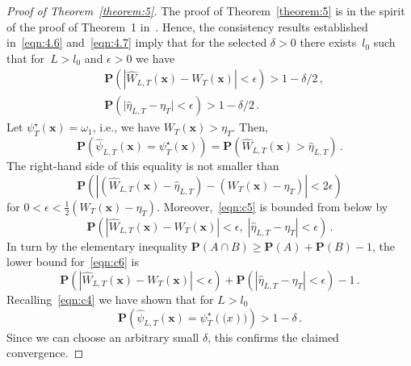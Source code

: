 \documentclass[lettersize,journal,onecolumn]{IEEEtran}
\theoremstyle{definition}
\begin{document}
\begin{proof}[Proof of Theorem~\ref{theorem:5}]
	The proof of Theorem~\ref{theorem:5} is in the spirit of the proof of Theorem~1
	in~\cite{greblicki1978asymptotically}. Hence, the consistency results established
	in~\eqref{eqn:4.6} and~\eqref{eqn:4.7} imply that for the selected $\delta>0$ there
	exists~$l_{0}$ such that for~$L > l_{0}$ and $\epsilon >0 $ we have
	\begin{equation}
		\begin{split}
			& \mathbf{P}\left(
			\left|
			\widehat{W}_{L,T}(\mathbf{x}) - W_{T}(\mathbf{x})
			\right| < \epsilon
			\right) > 1 - \delta/2
			\,,\\
			& \mathbf{P}\left(
			\Big|
			\widehat{\eta}_{L,T} - \eta_{T}
			\Big| < \epsilon
			\right) > 1 - \delta/2
			\,.
		\end{split}
		\label{eqn:c4}
	\end{equation}
	Let \mbox{$\psi_{T}^{\star}(\mathbf{x})=\omega_{1}$}, i.e., we have
	\mbox{$W_{T}(\mathbf{x})>\eta_{T}$}. Then,
	\begin{equation*}
		\mathbf{P}\left(
		\widehat{\psi}_{L,T}(\mathbf{x}) = \psi_{T}^{\star}(\mathbf{x})
		\right) = \mathbf{P}\left(
		\widehat{W}_{L,T}(\mathbf{x}) > \widehat{\eta}_{L,T}
		\right)
		\,.
	\end{equation*}
	The right-hand side of this equality is not smaller than
	\begin{equation}
		\mathbf{P}\left(\left|
		\left(
		\widehat{W}_{L,T}(\mathbf{x}) - \widehat{\eta}_{L,T}
		\right) - \left(
		W_{T}(\mathbf{x}) - \eta_{T}
		\right)
		\right| < 2\epsilon \right)
		\label{eqn:c5}
	\end{equation}
	for \mbox{$0<\epsilon<\frac{1}{2}\left(W_{T}(\mathbf{x})-\eta_{T}\right)$}.
	Moreover,~\eqref{eqn:c5} is bounded from below by
	\begin{equation}
		\mathbf{P}\left(
		\left|
		\widehat{W}_{L,T}(\mathbf{x}) - W_{T}(\mathbf{x})
		\right| < \epsilon,\;
		\left|
		\widehat{\eta}_{L,T} - \eta_{T}
		\right| < \epsilon
		\right)
		\label{eqn:c6}\,.
	\end{equation}
	In turn by the elementary inequality \mbox{$
		\mathbf{P}(A \cap B) \geq \mathbf{P}(A) + \mathbf{P}(B) - 1
		$}, the lower bound for~\eqref{eqn:c6} is
	\begin{equation*}
		\mathbf{P}\left(
		\left|
		\widehat{W}_{L,T}(\mathbf{x}) - W_{T}(\mathbf{x})
		\right| < \epsilon
		\right)
		+
		\mathbf{P}\left(
		\left|
		\widehat{\eta}_{L,T} - \eta_{T}
		\right| < \epsilon
		\right) - 1
		\,.
	\end{equation*}
	Recalling~\eqref{eqn:c4} we have shown that for $L>l_{0}$
	\begin{equation*}
		\mathbf{P}\left(
		\widehat{\psi}_{L,T}(\mathbf{x}) = \psi_{T}^{\star}(\mathbf(x))
		\right) > 1-\delta
		\,.
	\end{equation*}
	Since we can choose an arbitrary small $\delta$, this confirms the claimed
	convergence.
\end{proof}
\end{document}
